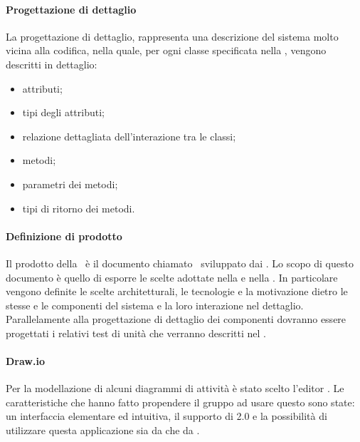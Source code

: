 \documentclass[12pt,a4paper]{article}
\begin{document}
\paragraph{Progettazione di dettaglio}\label{progettazioneDiDettaglio}

La progettazione di dettaglio, rappresenta una descrizione del sistema molto vicina alla codifica, nella quale, per ogni classe specificata nella \FPA{}, vengono descritti in dettaglio:
\begin{itemize}
	\item attributi;
	\item tipi degli attributi;
	\item relazione dettagliata dell'interazione tra le classi;
	\item metodi;
	\item parametri dei metodi;
	\item tipi di ritorno dei metodi.
\end{itemize}



\paragraph{Definizione di prodotto}\label{definizioneDiProdotto}

Il prodotto della \FPD\ è il documento chiamato \DP\ sviluppato dai \PGpl{}.
Lo scopo di questo documento è quello di esporre le scelte adottate nella \FPA{} e nella \DP{}.
In particolare vengono definite le scelte architetturali, le tecnologie e la motivazione dietro le stesse e le componenti del sistema e la loro interazione nel dettaglio.
Parallelamente alla progettazione di dettaglio dei componenti  dovranno essere progettati i relativi test di unità che verranno descritti nel \PdQ{}.


\paragraph{Draw.io}		 
Per la modellazione di alcuni diagrammi di attività è stato scelto l'editor . Le caratteristiche che hanno fatto propendere il gruppo ad usare questo  sono state: un interfaccia elementare ed intuitiva, il supporto di 2.0 e la possibilità di utilizzare questa applicazione sia da  che da .
\end{document}
